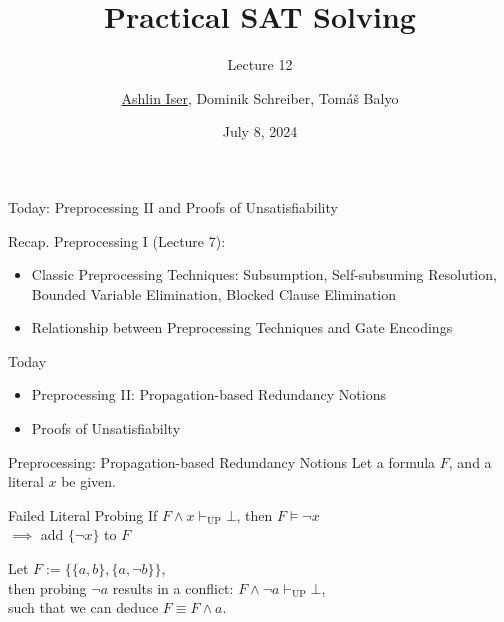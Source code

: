 \documentclass[t]{sdqbeamer}
\title[SAT Solving]{Practical SAT Solving}
\subtitle{Lecture 12}
\author{\underline{Ashlin Iser}, Dominik Schreiber, Tom\'a\v{s} Balyo}
\date{July 8, 2024}
\begin{document}
\begin{frame}
	\thispagestyle{empty}
	\titlepage
\end{frame}


\begin{frame}{Today: Preprocessing II and Proofs of Unsatisfiability}
    \begin{block}{Recap.}
    Preprocessing I (Lecture 7):
    \begin{itemize}
        \item Classic Preprocessing Techniques: Subsumption, Self-subsuming Resolution, Bounded Variable Elimination, Blocked Clause Elimination
        \item Relationship between Preprocessing Techniques and Gate Encodings
    \end{itemize}
    \end{block}
	\begin{block}{Today}
        \begin{itemize}
            \item Preprocessing II: Propagation-based Redundancy Notions
            \item Proofs of Unsatisfiabilty
        \end{itemize}
	\end{block}
\end{frame}
    

\begin{frame}{Preprocessing: Propagation-based Redundancy Notions}
Let a formula $F$, and a literal $x$ be given.
\begin{block}{Failed Literal Probing}
If $F \land x \vdash_{\mathop{UP}} \bot$, then $F \models \lnot x$\\[1ex]
$\implies$ add $\{ \lnot x \}$ to $F$
\end{block}
\begin{example}
Let $F := \bigl\{ \{a, b\}, \{a, \lnot b\} \bigr\}$,\\[1ex]
then probing $\lnot a$ results in a conflict: $F \land \lnot a \vdash_{\mathop{UP}} \bot$,\\[1ex]
such that we can deduce $F \equiv F \land a$.
\end{example}
\end{frame}
    
\end{document}
